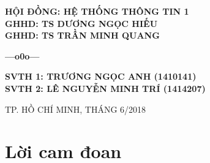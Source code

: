 \documentclass[12pt]{report}
\begin{document}
\begin{titlepage}
\vspace{15mm}

\begin{addmargin}[100pt]{0pt}
\textbf{{\fontsize{15}{15}\selectfont HỘI ĐỒNG: HỆ THỐNG THÔNG TIN 1}}\\
\textbf{{\fontsize{15}{15}\selectfont GHHD: TS DƯƠNG NGỌC HIẾU}}\\
\textbf{{\fontsize{15}{15}\selectfont GHHD: TS TRẦN MINH QUANG}}
\begin{center}
\textbf{{\fontsize{15}{15}\selectfont ---o0o---}}
\end{center}
\textbf{{\fontsize{15}{15}\selectfont SVTH 1: TRƯƠNG NGỌC ANH (1410141)}}\\
\textbf{{\fontsize{15}{15}\selectfont SVTH 2: LÊ NGUYỄN MINH TRÍ (1414207)}}\\

\end{addmargin}
\null\vfill
\begin{center}
        TP. HỒ CHÍ MINH, THÁNG 6/2018
\end{center}

\thispagestyle{empty}
\end{titlepage}
%
\tableofcontents

%

%
\listoffigures
\listoftables
\chapter*{Lời cam đoan}
\end{document}
